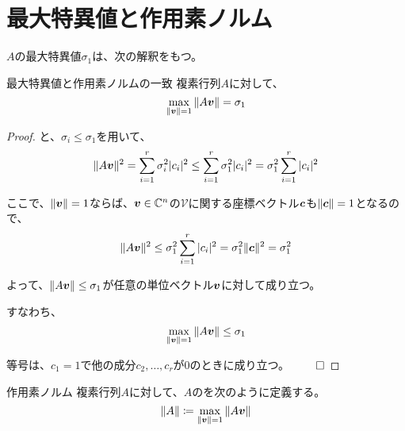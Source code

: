 \documentclass[../../../topic_linear-algebra]{subfiles}
\begin{document}
\sectionline
\section{最大特異値と作用素ノルム}

$A$の最大特異値$\sigma_1$は、次の解釈をもつ。

\begin{theorem*}{最大特異値と作用素ノルムの一致}
  複素行列$A$に対して、
  \begin{equation*}
    \max_{\| \vb*{v} \| = 1}{\| A \vb*{v} \|} = \sigma_1
  \end{equation*}
\end{theorem*}

\begin{proof}
  と、$\sigma_i \leq \sigma_1$を用いて、
  \begin{equation*}
    \| A \vb*{v} \|^2 = \sum_{i=1}^r \sigma_i^2 |c_i|^2 \leq \sum_{i=1}^r \sigma_1^2 |c_i|^2 = \sigma_1^2 \sum_{i=1}^r |c_i|^2
  \end{equation*}
  
  ここで、$\| \vb*{v} \| = 1$ならば、$\vb*{v} \in \mathbb{C}^n$の$\mathcal{V}$に関する座標ベクトル$\vb*{c}$も$\| \vb*{c} \| = 1$となるので、
  \begin{equation*}
    \| A \vb*{v} \|^2 \leq \sigma_1^2 \sum_{i=1}^r |c_i|^2 = \sigma_1^2 \| \vb*{c} \|^2 = \sigma_1^2
  \end{equation*}
  
  よって、$\| A \vb*{v} \| \leq \sigma_1$が任意の単位ベクトル$\vb*{v}$に対して成り立つ。
  
  すなわち、
  \begin{equation*}
    \max_{\| \vb*{v} \| = 1} \| A \vb*{v} \| \leq \sigma_1
  \end{equation*}
  
  等号は、$c_1 = 1$で他の成分$c_2, \dots, c_r$が0のときに成り立つ。 $\qed$
\end{proof}

\br

\begin{definition*}{作用素ノルム}
  複素行列$A$に対して、$A$のを次のように定義する。
  \begin{equation*}
    \| A \| \coloneq \max_{\| \vb*{v} \| = 1} \| A \vb*{v} \|
  \end{equation*}
\end{definition*}
\end{document}
